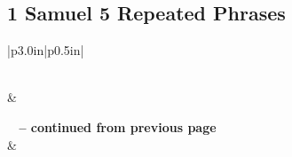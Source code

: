 \subsection{1 Samuel 5 Repeated Phrases}


\normalsize
 
\begin{center}
\begin{longtable}{|p{3.0in}|p{0.5in}|}
\caption[1 Samuel 5 Repeated Phrases]{1 Samuel 5 Repeated Phrases}\label{table:Repeated Phrases 1 Samuel 5} \\
\hline {} &  \\ \hline 
\endfirsthead
 
{{\bfseries \tablename\ \thetable{} -- continued from previous page}} \\  
\hline {} &  \\ \hline 
\endhead
 

\end{longtable}
\end{center}

